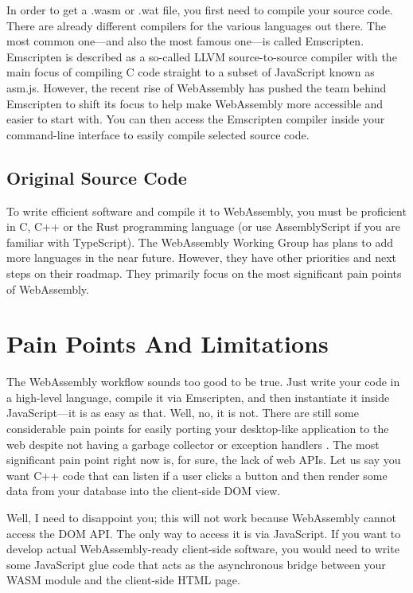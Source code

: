 \documentclass[10pt]{article}
\begin{document}
\begin{sloppypar}
  In order to get a .wasm or .wat file, you first need to compile your source code. There are already different compilers for the various languages out there. The most common one—and also the most famous one—is called Emscripten. Emscripten is described as a so-called LLVM source-to-source compiler with the main focus of compiling C code straight to a subset of JavaScript known as asm.js. However, the recent rise of WebAssembly has pushed the team behind Emscripten to shift its focus to help make WebAssembly more accessible and easier to start with. You can then access the Emscripten compiler inside your command-line interface to easily compile selected source code.

  \subsection{Original Source Code}
  \label{sec:original-source-code}

  To write efficient software and compile it to WebAssembly, you must be proficient in C, C++ or the Rust programming language (or use AssemblyScript if you are familiar with TypeScript). The WebAssembly Working Group has plans to add more languages in the near future. However, they have other priorities and next steps on their roadmap. They primarily focus on the most significant pain points of WebAssembly.

  \section{Pain Points And Limitations}
  \label{sec:pain-points-and-limitations}

  The WebAssembly workflow sounds too good to be true. Just write your code in a high-level language, compile it via Emscripten, and then instantiate it inside JavaScript—it is as easy as that. Well, no, it is not. There are still some considerable pain points for easily porting your desktop-like application to the web despite not having a garbage collector or exception handlers \citep{w3c_roadmap_2019}. The most significant pain point right now is, for sure, the lack of web APIs. Let us say you want C++ code that can listen if a user clicks a button and then render some data from your database into the client-side DOM view.

  Well, I need to disappoint you; this will not work because WebAssembly cannot access the DOM API. The only way to access it is via JavaScript. If you want to develop actual WebAssembly-ready client-side software, you would need to write some JavaScript glue code \citep{mihaylov_how_2018} that acts as the asynchronous bridge between your WASM module and the client-side HTML page.


\end{sloppypar}
\end{document}
